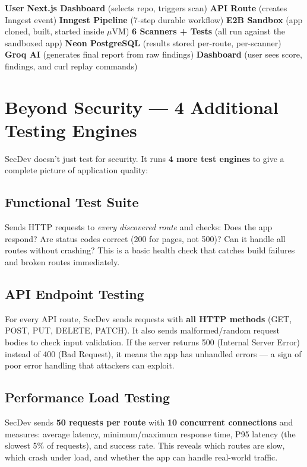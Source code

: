 \documentclass[11pt, a4paper]{article}
\begin{document}
\vspace{4pt}

\begin{tcolorbox}[highlight, title={\faCogs\enspace System Architecture --- How Components Connect}]
\small
\textbf{User} \;\faArrowRight\; \textbf{Next.js Dashboard} (selects repo, triggers scan)
\;\faArrowRight\; \textbf{API Route} (creates Inngest event)
\;\faArrowRight\; \textbf{Inngest Pipeline} (7-step durable workflow)
\;\faArrowRight\; \textbf{E2B Sandbox} (app cloned, built, started inside $\mu$VM)
\;\faArrowRight\; \textbf{6 Scanners + Tests} (all run against the sandboxed app)
\;\faArrowRight\; \textbf{Neon PostgreSQL} (results stored per-route, per-scanner)
\;\faArrowRight\; \textbf{Groq AI} (generates final report from raw findings)
\;\faArrowRight\; \textbf{Dashboard} (user sees score, findings, and curl replay commands)
\end{tcolorbox}

\section{Beyond Security --- 4 Additional Testing Engines}

SecDev doesn't just test for security. It runs \textbf{4 more test engines} to give a complete picture of application quality:

\subsection{Functional Test Suite}
Sends HTTP requests to \textit{every discovered route} and checks: Does the app respond? Are status codes correct (200 for pages, not 500)? Can it handle all routes without crashing? This is a basic health check that catches build failures and broken routes immediately.

\subsection{API Endpoint Testing}
For every API route, SecDev sends requests with \textbf{all HTTP methods} (GET, POST, PUT, DELETE, PATCH). It also sends malformed/random request bodies to check input validation. If the server returns 500 (Internal Server Error) instead of 400 (Bad Request), it means the app has unhandled errors --- a sign of poor error handling that attackers can exploit.

\subsection{Performance Load Testing}
SecDev sends \textbf{50 requests per route} with \textbf{10 concurrent connections} and measures: average latency, minimum/maximum response time, P95 latency (the slowest 5\% of requests), and success rate. This reveals which routes are slow, which crash under load, and whether the app can handle real-world traffic.
\end{document}
